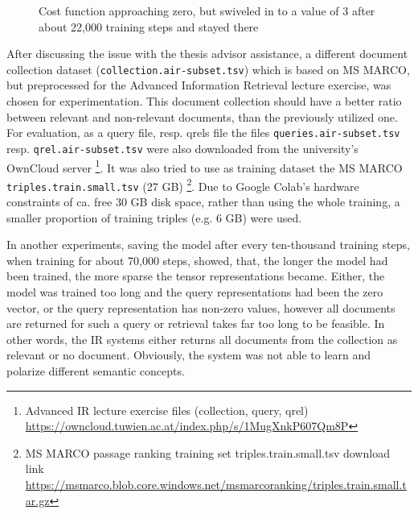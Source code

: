 \begin{figure}[htbp]
\centering
\caption[Cost function swiveling in to a value of 3]{Cost function approaching zero, but swiveled in to a value of 3 after about 22,000 training steps and stayed there} 
\label{fig:2019-12-30:cost-fn} %
\end{figure}

After discussing the issue with the thesis advisor assistance, 
    a different document collection dataset (\verb|collection.air-subset.tsv|) 
    which is based on MS MARCO, but preprocessed for the Advanced Information Retrieval 
    lecture exercise, was chosen for experimentation.
This document collection should have a better ratio between relevant and non-relevant documents,
    than the previously utilized one.
For evaluation, as a query file, resp. qrels file the files \verb|queries.air-subset.tsv| resp.
    \verb|qrel.air-subset.tsv| were also downloaded from the university's OwnCloud server 
    \footnote{Advanced IR lecture exercise files (collection, query, qrel) \url{https://owncloud.tuwien.ac.at/index.php/s/1MugXnkP607Qm8P}}.
It was also tried to use as training dataset the MS MARCO \verb|triples.train.small.tsv| (27 GB)
    \footnote{MS MARCO passage ranking training set triples.train.small.tsv download link \url{https://msmarco.blob.core.windows.net/msmarcoranking/triples.train.small.tar.gz}}.
Due to Google Colab's hardware constraints of ca. free 30 GB disk space, rather than using the whole training,
    a smaller proportion of training triples (e.g. 6 GB) were used.

In another experiments, saving the model after every ten-thousand training steps, when training for about 70,000 steps, 
    showed, that, the longer the model had been trained, the more sparse the tensor representations became.
Either, the model was trained too long and the query representations had been the zero vector,
    or the query representation has non-zero values, however all documents are returned for such a query or 
    retrieval takes far too long to be feasible.
In other words, the IR systems either returns all documents from the collection as relevant or no document.
Obviously, the system was not able to learn and polarize different semantic concepts.

